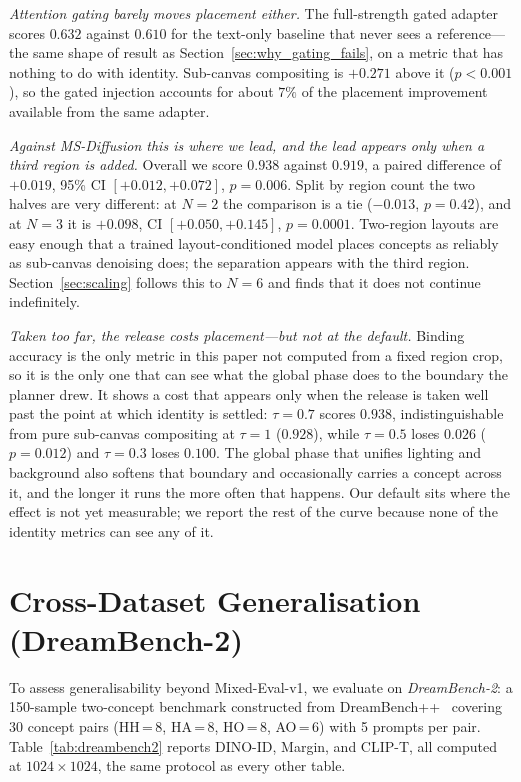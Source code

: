 \documentclass[review,10pt,times]{elsarticle}
\begin{document}
\noindent\textit{Attention gating barely moves placement either.}
The full-strength gated adapter scores $0.632$ against $0.610$ for the
text-only baseline that never sees a reference---the same shape of result
as Section~\ref{sec:why_gating_fails}, on a metric that has nothing to do
with identity.  Sub-canvas compositing is $+0.271$ above it
($p{<}0.001$), so the gated injection accounts for about $7\%$ of the
placement improvement available from the same adapter.

\noindent\textit{Against MS-Diffusion this is where we lead, and the lead
appears only when a third region is added.}
Overall we score $0.938$ against $0.919$, a paired difference of $+0.019$,
95\% CI $[+0.012,+0.072]$, $p{=}0.006$.  Split by region count the two halves
are very different: at $N{=}2$ the comparison is a tie ($-0.013$, $p{=}0.42$),
and at $N{=}3$ it is $+0.098$, CI $[+0.050,+0.145]$, $p{=}0.0001$.
Two-region layouts are easy enough that a trained layout-conditioned model
places concepts as reliably as sub-canvas denoising does; the separation
appears with the third region.  Section~\ref{sec:scaling} follows this to
$N{=}6$ and finds that it does not continue indefinitely.

\noindent\textit{Taken too far, the release costs placement---but not at the
default.}
Binding accuracy is the only metric in this paper not computed from a fixed
region crop, so it is the only one that can see what the global phase does to
the boundary the planner drew.  It shows a cost that appears only when the
release is taken well past the point at which identity is settled:
$\tau{=}0.7$ scores $0.938$, indistinguishable from pure sub-canvas
compositing at $\tau{=}1$ ($0.928$), while $\tau{=}0.5$ loses $0.026$
($p{=}0.012$) and $\tau{=}0.3$ loses $0.100$.  The global phase that unifies
lighting and background also softens that boundary and occasionally carries a
concept across it, and the longer it runs the more often that happens.  Our
default sits where the effect is not yet measurable; we report the rest of
the curve because none of the identity metrics can see any of it.


\section{Cross-Dataset Generalisation (DreamBench-2)}
\label{sec:dreambench2}

To assess generalisability beyond Mixed-Eval-v1, we evaluate on
\emph{DreamBench-2}: a 150-sample two-concept benchmark constructed from
DreamBench++~\cite{peng2025dreambench} covering 30 concept pairs
(HH\,=\,8, HA\,=\,8, HO\,=\,8, AO\,=\,6) with 5 prompts per pair.
Table~\ref{tab:dreambench2} reports DINO-ID, Margin, and CLIP-T, all
computed at $1024\times1024$, the same protocol as every other table.
\end{document}
